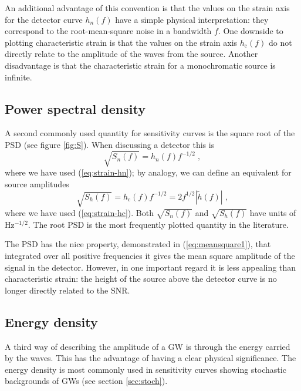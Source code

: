An additional advantage of this convention is that the values on the strain axis for the detector curve $h_n(f)$ have a simple physical interpretation: they correspond to the root-mean-square noise in a bandwidth $f$. One downside to plotting characteristic strain is that the values on the strain axis $h_\mathrm{c}(f)$ do not directly relate to the amplitude of the waves from the source. Another disadvantage is that the characteristic strain for a monochromatic source is infinite.

\subsection{Power spectral density }\label{sec:psd}

A second commonly used quantity for sensitivity curves is the square root of the PSD (see figure \ref{fig:S}). When discussing a detector this is
\begin{equation}\label{eq:temp1}
\sqrt{S_{n}(f)} = h_{n}(f)f^{-1/2} \; ,
\end{equation}
where we have used (\ref{eq:strain-hn}); by analogy, we can define an equivalent for source amplitudes
\begin{equation}
\sqrt{S_{h}(f)} = h_\mathrm{c}(f)f^{-1/2} = 2 f^{1/2} \left| \tilde{h}(f) \right| \; ,
\label{eq:ShforSources}
\end{equation}
where we have used (\ref{eq:strain-hc}). Both $\sqrt{S_{n}(f)}$ and $\sqrt{S_{h}(f)}$ have units of $\mathrm{Hz^{-1/2}}$. The root PSD is the most frequently plotted quantity in the literature.

The PSD has the nice property, demonstrated in (\ref{eq:meansquare1}), that integrated over all positive frequencies it gives the mean square amplitude of the signal in the detector. However, in one important regard it is less appealing than characteristic strain: the height of the source above the detector curve is no longer directly related to the SNR.


\subsection{Energy density}\label{sec:energy-density}

A third way of describing the amplitude of a GW is through the energy carried by the waves. This has the advantage of having a clear physical significance. The energy density is most commonly used in sensitivity curves showing stochastic backgrounds of GWs (see section \ref{sec:stoch}).


